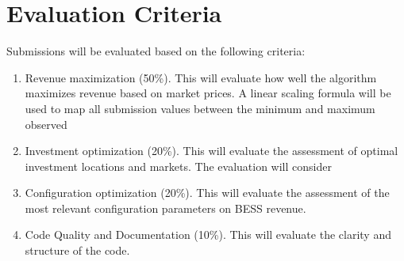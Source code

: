 \section{Evaluation Criteria}
Submissions will be evaluated based on the following criteria:
\begin{enumerate}
    \item Revenue maximization (50\%). This will evaluate how well the algorithm maximizes revenue based on market prices. A linear scaling formula will be used to map all submission values between the minimum and maximum observed
    \item Investment optimization (20\%). This will evaluate the assessment of optimal investment locations and markets. The evaluation will consider
    \item Configuration optimization (20\%). This will evaluate the assessment of the most relevant configuration parameters on BESS revenue.
    \item Code Quality and Documentation (10\%). This will evaluate the clarity and structure of the code.
\end{enumerate}


